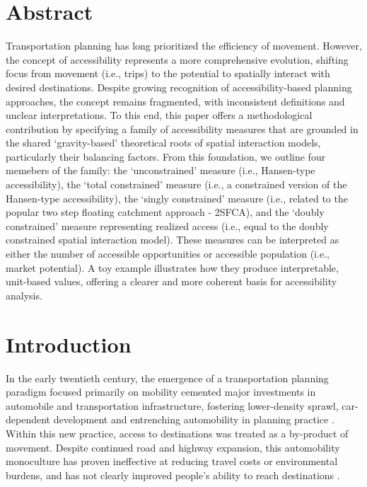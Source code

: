 \documentclass[
  10pt,
  letterpaper,
]{article}
\begin{document}
\section*{Abstract}
Transportation planning has long prioritized the efficiency of movement.
However, the concept of accessibility represents a more comprehensive
evolution, shifting focus from movement (i.e., trips) to the potential
to spatially interact with desired destinations. Despite growing
recognition of accessibility-based planning approaches, the concept
remains fragmented, with inconsistent definitions and unclear
interpretations. To this end, this paper offers a methodological
contribution by specifying a family of accessibility measures that are
grounded in the shared `gravity-based' theoretical roots of spatial
interaction models, particularly their balancing factors. From this
foundation, we outline four memebers of the family: the `unconstrained'
measure (i.e., Hansen-type accessibility), the `total constrained'
measure (i.e., a constrained version of the Hansen-type accessibility),
the `singly constrained' measure (i.e., related to the popular two step
floating catchment approach - 2SFCA), and the `doubly constrained'
measure representing realized access (i.e., equal to the doubly
constrained spatial interaction model). These measures can be
interpreted as either the number of accessible opportunities or
accessible population (i.e., market potential). A toy example
illustrates how they produce interpretable, unit-based values, offering
a clearer and more coherent basis for accessibility analysis.


\linenumbers

\section{Introduction}\label{introduction}

In the early twentieth century, the emergence of a transportation
planning paradigm focused primarily on mobility cemented major
investments in automobile and transportation infrastructure, fostering
lower-density sprawl, car-dependent development and entrenching
automobility in planning practice
\citep{miller_collaborative_2011, lavery_driving_2013}. Within this new
practice, access to destinations was treated as a by-product of
movement. Despite continued road and highway expansion, this
automobility monoculture has proven ineffective at reducing travel costs
or environmental burdens, and has not clearly improved people's ability
to reach destinations
\citep{farber_running_2011, handyACCESSIBILITYVSMOBILITYENHANCING2002, paez_healthcare_2010}.
\end{document}
